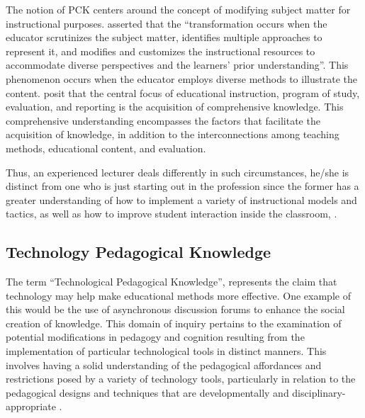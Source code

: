 \documentclass[english]{textolivre}
\begin{document}
The notion of PCK centers around the concept of modifying subject matter for instructional purposes. \textcite[p. 83]{wittrock_paradigms_1986} asserted that the “transformation occurs when the educator scrutinizes the subject matter, identifies multiple approaches to represent it, and modifies and customizes the instructional resources to accommodate diverse perspectives and the learners’ prior understanding”. This phenomenon occurs when the educator employs diverse methods to illustrate the content. \textcite{gomez-trigueros_digital_2021} posit that the central focus of educational instruction, program of study, evaluation, and reporting is the acquisition of comprehensive knowledge. This comprehensive understanding encompasses the factors that facilitate the acquisition of knowledge, in addition to the interconnections among teaching methods, educational content, and evaluation.

Thus, an experienced lecturer deals differently in such circumstances, he/she is distinct from one who is just starting out in the profession since the former has a greater understanding of how to implement a variety of instructional models and tactics, as well as how to improve student interaction inside the classroom, \textcite{oner_virtual_2020}.

\subsection{Technology Pedagogical Knowledge}

The term “Technological Pedagogical Knowledge”, represents the claim that technology may help make educational methods more effective. One example of this would be the use of asynchronous discussion forums to enhance the social creation of knowledge. This domain of inquiry pertains to the examination of potential modifications in pedagogy and cognition resulting from the implementation of particular technological tools in distinct manners. This involves having a solid understanding of the pedagogical affordances and restrictions posed by a variety of technology tools, particularly in relation to the pedagogical designs and techniques that are developmentally and disciplinary-appropriate \cite{lyublinskaya_analysis_2022}.
\end{document}
